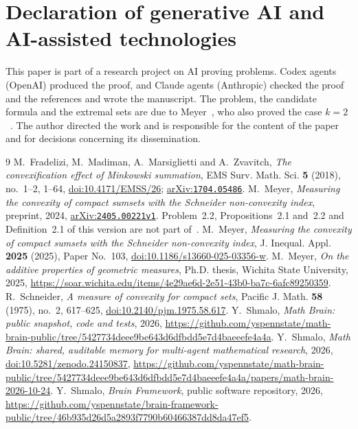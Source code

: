 \documentclass[11pt]{amsart}
\theoremstyle{remark}
\newcommand{\arxiv}[1]{\href{https://arxiv.org/abs/#1}{arXiv:\nolinkurl{#1}}}
\begin{document}
\section*{Declaration of generative AI and AI-assisted technologies}
This paper is part of a research project on AI proving problems. Codex agents (OpenAI) produced the proof, and Claude
agents (Anthropic) checked the proof and the references and wrote the manuscript. The problem, the candidate formula
and the extremal sets are due to Meyer~\cite{MeyerArx}, who also proved the case $k=2$~\cite{MeyerJIA,MeyerThesis}. The
author directed the work and is responsible for the content
of the paper and for decisions concerning its dissemination.

\begin{thebibliography}{9}
 M.~Fradelizi, M.~Madiman, A.~Marsiglietti and A.~Zvavitch, \emph{The convexification effect of
Minkowski summation}, EMS Surv. Math. Sci. \textbf{5} (2018), no.~1--2, 1--64,
\href{https://doi.org/10.4171/EMSS/26}{doi:10.4171/EMSS/26}; \arxiv{1704.05486}.
 M.~Meyer, \emph{Measuring the convexity of compact sumsets with the Schneider non-convexity index},
preprint, 2024, \arxiv{2405.00221v1}. Problem~2.2, Propositions~2.1 and~2.2 and Definition~2.1 of this
version are not part of~\cite{MeyerJIA}.
 M.~Meyer, \emph{Measuring the convexity of compact sumsets with the Schneider non-convexity index},
J. Inequal. Appl. \textbf{2025} (2025), Paper No.~103,
\href{https://doi.org/10.1186/s13660-025-03356-w}{doi:10.1186/s13660-025-03356-w}.
 M.~Meyer, \emph{On the additive properties of geometric measures}, Ph.D. thesis, Wichita State
University, 2025, \url{https://soar.wichita.edu/items/4e29ae6d-2e51-43b0-ba7c-6afc89250359}.
 R.~Schneider, \emph{A measure of convexity for compact sets}, Pacific J. Math. \textbf{58} (1975),
no.~2, 617--625, \href{https://doi.org/10.2140/pjm.1975.58.617}{doi:10.2140/pjm.1975.58.617}.
 Y.~Shmalo, \emph{Math Brain: public snapshot, code and tests}, 2026,
\url{https://github.com/yspennstate/math-brain-public/tree/5427734deee9be643d6dfbdd5e7d4baeeefe4a4a}.
 Y.~Shmalo, \emph{Math Brain: shared, auditable memory for multi-agent mathematical
research}, 2026, \href{https://doi.org/10.5281/zenodo.24150837}{doi:10.5281/zenodo.24150837},
\url{https://github.com/yspennstate/math-brain-public/tree/5427734deee9be643d6dfbdd5e7d4baeeefe4a4a/papers/math-brain-2026-10-24}.
 Y.~Shmalo, \emph{Brain Framework}, public software repository, 2026,
\url{https://github.com/yspennstate/brain-framework-public/tree/46b935d26d5a2893f7790b60466387dd8da47ef5}.
\end{thebibliography}
\end{document}
